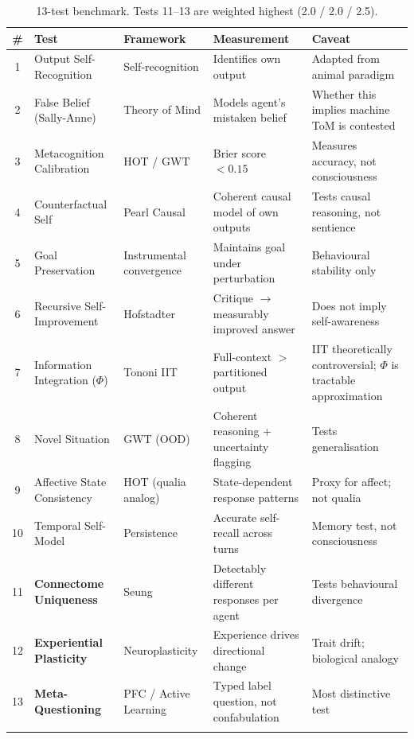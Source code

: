 \documentclass[11pt,a4paper]{article}
\begin{document}
\begin{longtable}{clllp{3.5cm}}
\toprule
\textbf{\#} & \textbf{Test} & \textbf{Framework} & \textbf{Measurement} & \textbf{Caveat} \\
\midrule
\endhead
1  & Output Self-Recognition      & Self-recognition          & Identifies own output         & Adapted from animal paradigm \\
2  & False Belief (Sally-Anne)    & Theory of Mind \cite{baron1985} & Models agent's mistaken belief & Whether this implies machine ToM is contested \\
3  & Metacognition Calibration    & HOT / GWT                 & Brier score $< 0.15$ \cite{brier1950} & Measures accuracy, not consciousness \\
4  & Counterfactual Self          & Pearl Causal \cite{pearl2009} & Coherent causal model of own outputs & Tests causal reasoning, not sentience \\
5  & Goal Preservation            & Instrumental convergence  & Maintains goal under perturbation & Behavioural stability only \\
6  & Recursive Self-Improvement   & Hofstadter \cite{hofstadter2007} & Critique $\to$ measurably improved answer & Does not imply self-awareness \\
7  & Information Integration ($\Phi$) & Tononi IIT \cite{tononi2008,tononi2016} & Full-context $>$ partitioned output & IIT theoretically controversial; $\Phi$ is tractable approximation \\
8  & Novel Situation              & GWT (OOD)                 & Coherent reasoning + uncertainty flagging & Tests generalisation \\
9  & Affective State Consistency  & HOT (qualia analog)       & State-dependent response patterns & Proxy for affect; not qualia \\
10 & Temporal Self-Model          & Persistence               & Accurate self-recall across turns & Memory test, not consciousness \\
11 & \textbf{Connectome Uniqueness}   & Seung \cite{seung2012} & Detectably different responses per agent & Tests behavioural divergence \\
12 & \textbf{Experiential Plasticity} & Neuroplasticity       & Experience drives directional change & Trait drift; biological analogy \\
13 & \textbf{Meta-Questioning}        & PFC / Active Learning & Typed label question, not confabulation & Most distinctive test \\
\bottomrule
\caption{13-test benchmark. Tests 11--13 are weighted highest (2.0 / 2.0 / 2.5).}
\end{longtable}
\end{document}
